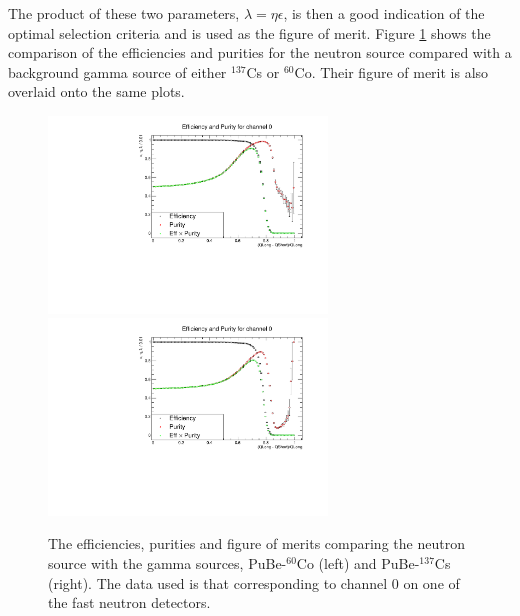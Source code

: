 The product of these two parameters, $\lambda = \eta\epsilon$, is then a good indication of the optimal selection criteria and is used as the figure of merit. Figure \ref{fig:modesPSDEffAndPur} shows the comparison of the efficiencies and purities for the neutron source compared with a background gamma source of either $^{137}$Cs or $^{60}$Co. Their figure of merit is also overlaid onto the same plots.

\begin{figure}[htbp]
\begin{center}
\includegraphics[width=74mm]{Chapter8/figures/eff_pur_pube_co60_errors.pdf}
\includegraphics[width=74mm]{Chapter8/figures/eff_pur_pube_cs137_errors.pdf} 
\caption{The efficiencies, purities and figure of merits comparing the neutron source with the gamma sources, PuBe-$^{60}$Co (left) and PuBe-$^{137}$Cs (right). The data used is that corresponding to channel 0 on one of the fast neutron detectors.}
\label{fig:modesPSDEffAndPur}
\end{center}
\end{figure}


